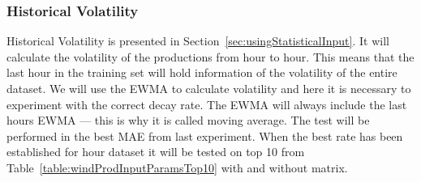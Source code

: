 \subsubsection{Historical Volatility}
Historical Volatility is presented in Section~\ref{sec:usingStatisticalInput}. It will calculate the volatility of the productions from hour to hour. This means that the last hour in the training set will hold information of the volatility of the entire dataset. We will use the EWMA to calculate volatility  and here it is necessary to experiment with the correct decay rate. The EWMA will always include the last hours EWMA --- this is why it is called moving average. The test will be performed in the best MAE from last experiment. When the best rate has been established for hour dataset it will be tested on top 10 from Table~\ref{table:windProdInputParamsTop10} with and without matrix.

